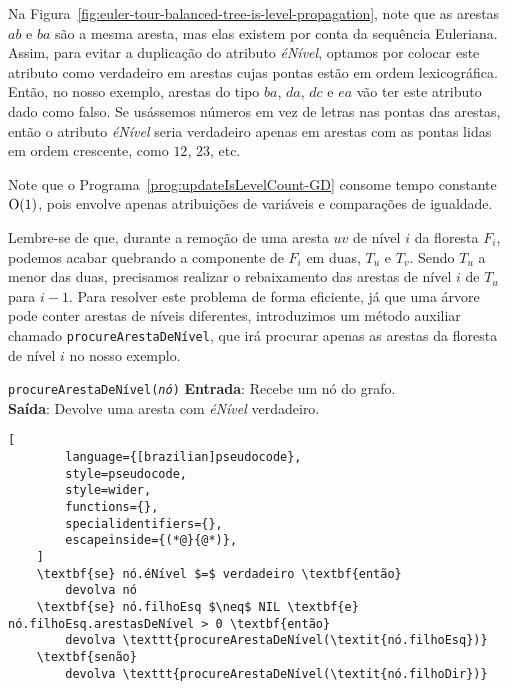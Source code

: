 Na Figura~\ref{fig:euler-tour-balanced-tree-is-level-propagation}, note que as arestas $ab$ e $ba$ são a mesma aresta, mas elas existem por conta da sequência Euleriana. Assim, para evitar a duplicação do atributo \textit{éNível}, optamos por colocar este atributo como verdadeiro em arestas cujas pontas estão em ordem lexicográfica. Então, no nosso exemplo, arestas do tipo $ba$, $da$, $dc$ e $ea$ vão ter este atributo dado como falso. Se usássemos números em vez de letras nas pontas das arestas, então o atributo \textit{éNível} seria verdadeiro apenas em arestas com as pontas lidas em ordem crescente, como $12$, $23$, etc.  

Note que o Programa~\ref{prog:updateIsLevelCount-GD} consome tempo constante $\mathrm{O}(1)$, pois envolve apenas atribuições de variáveis e comparações de igualdade.

Lembre-se de que, durante a remoção de uma aresta $uv$ de nível $i$ da floresta $F_i$, podemos acabar quebrando a componente de $F_i$ em duas, $T_u$ e $T_v$. Sendo $T_u$ a menor das duas, precisamos realizar o rebaixamento das arestas de nível $i$ de $T_u$ para $i-1$. Para 
resolver este problema de forma eficiente, já que uma árvore pode conter arestas de níveis diferentes, introduzimos um método auxiliar chamado \texttt{procureArestaDeNível}, que irá procurar apenas as arestas da floresta de nível $i$ no nosso exemplo.

\begin{programruledcaption}{\texttt{procureArestaDeNível(\textit{nó})} \label{prog:findEdgesIsLevel-GD}}
    \noindent\textbf{Entrada}: Recebe um nó do grafo.
    \\
    \noindent\textbf{Saída}: Devolve uma aresta com \textit{éNível} verdadeiro.
    \vspace{-0.5\baselineskip}
    \begin{lstlisting}[
        language={[brazilian]pseudocode},
        style=pseudocode,
        style=wider,
        functions={},
        specialidentifiers={},
        escapeinside={(*@}{@*)},
    ]
    \textbf{se} nó.éNível $=$ verdadeiro \textbf{então}
        devolva nó
    \textbf{se} nó.filhoEsq $\neq$ NIL \textbf{e} nó.filhoEsq.arestasDeNível > 0 \textbf{então}
        devolva \texttt{procureArestaDeNível(\textit{nó.filhoEsq})}
    \textbf{senão}
        devolva \texttt{procureArestaDeNível(\textit{nó.filhoDir})}
\end{lstlisting}
\vspace{-0.5\baselineskip}
\end{programruledcaption}

